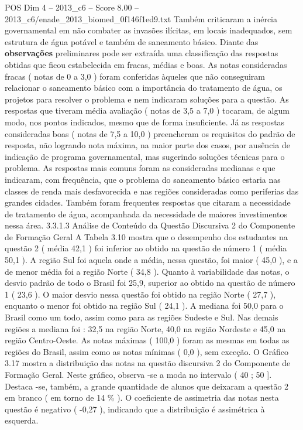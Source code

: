 \begin{textsample}{POS Dim 4 – 2013\_c6 – Score 8.00 – 2013\_c6/enade\_2013\_biomed\_0f146f1ed9.txt}
Também criticaram a inércia governamental em não combater as invasões ilícitas, em locais inadequados, sem estrutura de água potável e também de saneamento básico.
Diante das \textbf{observações} preliminares pode ser extraída uma classificação das respostas obtidas que ficou estabelecida em fracas, médias e boas.
As notas consideradas fracas ( notas de 0 a 3,0 ) foram conferidas àqueles que não conseguiram relacionar o saneamento básico com a importância do tratamento de água, os projetos para resolver o problema e nem indicaram soluções para a questão.
As respostas que tiveram média avaliação ( notas de 3,5 a 7,0 ) tocaram, de algum modo, nos pontos indicados, mesmo que de forma insuficiente.
Já as respostas consideradas boas ( notas de 7,5 a 10,0 ) preencheram os requisitos do padrão de resposta, não logrando nota máxima, na maior parte dos casos, por ausência de indicação de programa governamental, mas sugerindo soluções técnicas para o problema.
As respostas mais comuns foram as consideradas medianas e que indicaram, com frequência, que o problema do saneamento básico estaria nas classes de renda mais desfavorecida e nas regiões consideradas como periferias das grandes cidades.
Também foram frequentes respostas que citaram a necessidade de tratamento de água, acompanhada da necessidade de maiores investimentos nessa área. 3.3.1.3 Análise de Conteúdo da Questão Discursiva 2 do Componente de Formação Geral A Tabela 3.10 mostra que o desempenho dos estudantes na questão 2 ( média 42,1 ) foi inferior ao obtido na questão de número 1 ( média 50,1 ).
A região Sul foi aquela onde a média, nessa questão, foi maior ( 45,0 ), e a de menor média foi a região Norte ( 34,8 ).
Quanto à variabilidade das notas, o desvio padrão de todo o Brasil foi 25,9, superior ao obtido na questão de número 1 ( 23,6 ).
O maior desvio nessa questão foi obtido na região Norte ( 27,7 ), enquanto o menor foi obtido na região Sul ( 24,1 ).
A mediana foi 50,0 para o Brasil como um todo, assim como para as regiões Sudeste e Sul.
Nas demais regiões a mediana foi : 32,5 na região Norte, 40,0 na região Nordeste e 45,0 na região Centro-Oeste.
As notas máximas ( 100,0 ) foram as mesmas em todas as regiões do Brasil, assim como as notas mínimas ( 0,0 ), sem exceção.
O Gráfico 3.17 mostra a distribuição das notas na questão discursiva 2 do Componente de Formação Geral.
Neste gráfico, observa -se a moda no intervalo ( 40 ; 50 ].
Destaca -se, também, a grande quantidade de alunos que deixaram a questão 2 em branco ( em torno de 14 \% ).
O coeficiente de assimetria das notas nesta questão é negativo ( -0,27 ), indicando que a distribuição é assimétrica à esquerda.

\end{textsample}
